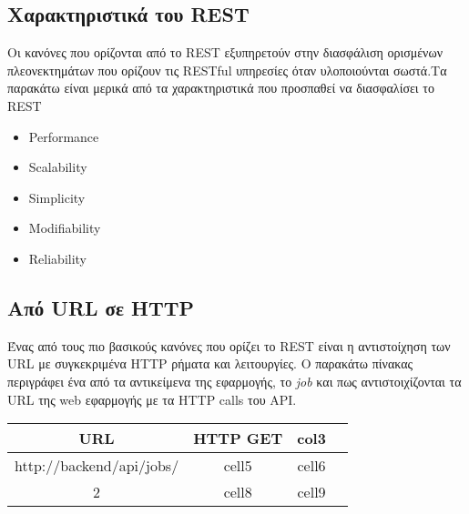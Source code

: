\subsection{Χαρακτηριστικά του REST}
Οι κανόνες που ορίζονται από το REST εξυπηρετούν στην διασφάλιση ορισμένων πλεονεκτημάτων που ορίζουν τις RESTful υπηρεσίες όταν υλοποιούνται σωστά.Τα παρακάτω είναι μερικά από τα χαρακτηριστικά που προσπαθεί να διασφαλίσει το REST
\begin{itemize}
\item Performance 
\item Scalability
\item Simplicity
\item Modifiability
\item Reliability
\end{itemize}


\subsection{Από URL σε HTTP}
Ένας από τους πιο βασικούς κανόνες που ορίζει το REST είναι η αντιστοίχηση των URL με συγκεκριμένα HTTP ρήματα και λειτουργίες.
Ο παρακάτω πίνακας περιγράφει ένα από τα αντικείμενα της εφαρμογής, το \textit{job} και πως αντιστοιχίζονται τα URL της web εφαρμογής με τα HTTP calls του API.

\begin{center}
\begin{tabular}{ |c|c|c|c| } 
\hline
URL & HTTP GET & col3 \\
\hline
http://{backend}/api/jobs/ & cell5 & cell6 \\ 
2 & cell8 & cell9 \\ 
\hline
\end{tabular}
\end{center}







